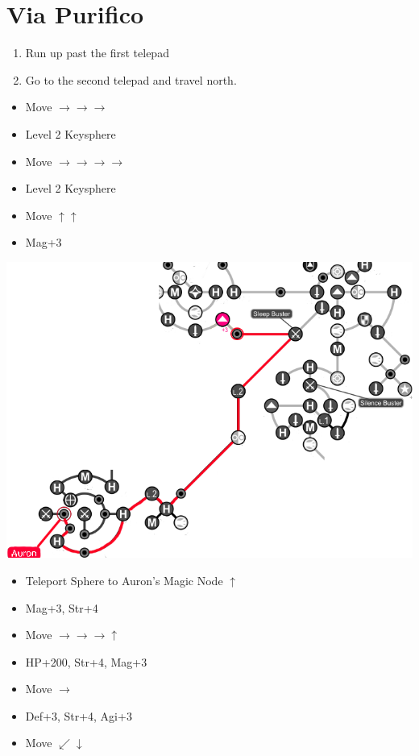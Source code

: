 \chapter{Via Purifico}

\begin{enumerate}
  \item Run up past the first telepad
  \item Go to the second telepad and travel north.
\end{enumerate}
\begin{spheregrid}
  \begin{itemize}
    \auronf
    \begin{itemize}
      \item Move $\rightarrow\rightarrow\rightarrow$
      \item Level 2 Keysphere
      \item Move $\rightarrow\rightarrow\rightarrow\rightarrow$
      \item Level 2 Keysphere
      \item Move $\uparrow\uparrow$
      \item Mag+3
    \end{itemize}
    \includegraphics[width=.8\columnwidth]{graphics/Auron_Via_Purifico}
    \yunaf
    \begin{itemize}
      \item Teleport Sphere to Auron's Magic Node $\uparrow$
      \item Mag+3, Str+4
      \item Move $\rightarrow\rightarrow\rightarrow\uparrow$
      \item HP+200, Str+4, Mag+3
      \item Move $\rightarrow$
      \item Def+3, Str+4, Agi+3
      \item Move $\swarrow\downarrow$

\end{itemize}
\end{itemize}
\end{spheregrid}
